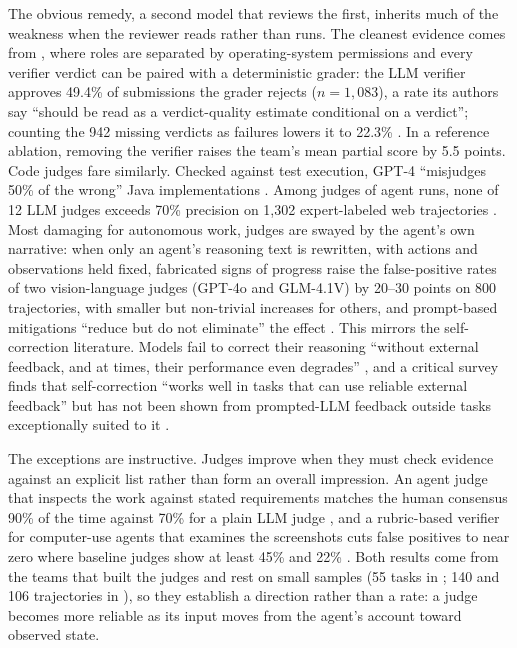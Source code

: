 The obvious remedy, a second model that reviews the first, inherits much of the weakness when the reviewer reads rather than runs. The cleanest evidence comes from \citet{T18}, where roles are separated by operating-system permissions and every verifier verdict can be paired with a deterministic grader: the LLM verifier approves 49.4\% of submissions the grader rejects ($n = 1{,}083$), a rate its authors say ``should be read as a verdict-quality estimate conditional on a verdict''; counting the 942 missing verdicts as failures lowers it to 22.3\% \citep[pp.~7--8]{T18}. In a reference ablation, removing the verifier raises the team's mean partial score by 5.5 points. Code judges fare similarly. Checked against test execution, GPT-4 ``misjudges 50\% of the wrong'' Java implementations \citep{V9}. Among judges of agent runs, none of 12 LLM judges exceeds 70\% precision on 1,302 expert-labeled web trajectories \citep{V25}. Most damaging for autonomous work, judges are swayed by the agent's own narrative: when only an agent's reasoning text is rewritten, with actions and observations held fixed, fabricated signs of progress raise the false-positive rates of two vision-language judges (GPT-4o and GLM-4.1V) by 20--30 points on 800 trajectories, with smaller but non-trivial increases for others, and prompt-based mitigations ``reduce but do not eliminate'' the effect \citep{V24}. This mirrors the self-correction literature. Models fail to correct their reasoning ``without external feedback, and at times, their performance even degrades'' \citep{A4}, and a critical survey finds that self-correction ``works well in tasks that can use reliable external feedback'' but has not been shown from prompted-LLM feedback outside tasks exceptionally suited to it \citep{A5}.

The exceptions are instructive. Judges improve when they must check evidence against an explicit list rather than form an overall impression. An agent judge that inspects the work against stated requirements matches the human consensus 90\% of the time against 70\% for a plain LLM judge \citep{V15}, and a rubric-based verifier for computer-use agents that examines the screenshots cuts false positives to near zero where baseline judges show at least 45\% and 22\% \citep{V29}. Both results come from the teams that built the judges and rest on small samples (55 tasks in \citealt{V15}; 140 and 106 trajectories in \citealt{V29}), so they establish a direction rather than a rate: a judge becomes more reliable as its input moves from the agent's account toward observed state.

